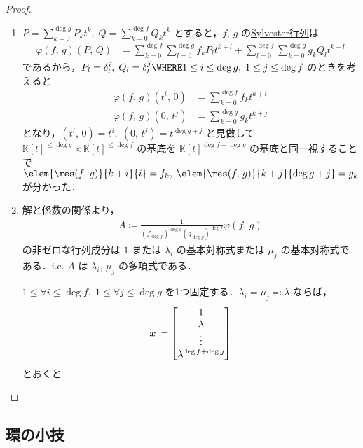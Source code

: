 \documentclass[TQFT_main]{subfiles}
\begin{document}
\begin{proof}
    \begin{enumerate}
        \item $P = \sum_{k=0}^{\deg g} P_k t^k,\; Q = \sum_{k=0}^{\deg f} Q_k t^{k}$ とすると，$f,\, g$ の\hyperref[def:resultant]{Sylvester行列}は
        \begin{align}
            \varphi(f,\, g)(P,\, Q)
            &= \sum_{k = 0}^{\deg f}\sum_{l = 0}^{\deg g} f_k P_{l} t^{k+l} + \sum_{l = 0}^{\deg f}\sum_{k = 0}^{\deg g} g_k Q_{l} t^{k + l}
        \end{align}
        であるから，$P_l = \delta_l^i,\; Q_l = \delta_l^{j} \WHERE 1 \le i \le \deg g,\; 1 \le j \le \deg f$ のときを考えると
        \begin{align}
            \varphi(f,\, g)(t^i,\, 0) 
            &= \sum_{k=0}^{\deg f} f_k t^{k+i} \\
            \varphi(f,\, g)(0,\, t^{j})
            &= \sum_{k=0}^{\deg g} g_k t^{k + j}
        \end{align}
        となり，$(t^i,\, 0) = t^i,\; (0,\, t^j) = t^{\deg g + j}$ と見做して $ \mathbb{K}[t]^{\le \deg g} \times \mathbb{K}[t]^{\le \deg f}$ の基底を $\mathbb{K}[t]^{\deg f + \deg g}$ の基底と同一視することで $\elem{\res (f,\, g)}{k+i}{i} = f_k,\; \elem{\res (f,\, g)}{k + j}{\deg g + j} = g_k$ が分かった．

        \item 解と係数の関係より，
        \begin{align}
            A \coloneqq \frac{1}{(f_{\deg f})^{\deg g} (g_{\deg g})^{\deg f}} \varphi(f,\, g)
        \end{align}
        の非ゼロな行列成分は $1$ または $\lambda_i$ の基本対称式または $\mu_j$ の基本対称式である．i.e. $A$ は $\lambda_i,\, \mu_j$ の多項式である．
        
        $1\le \forall i \le \deg f,\; 1 \le \forall j \le \deg g$ を1つ固定する．$\lambda_i = \mu_j \eqqcolon \lambda$ ならば，
        \begin{align}
            \bm{x} \coloneqq \mqty[1 \\ \lambda \\ \vdots \\ \lambda^{\deg f + \deg g}]
        \end{align}
        とおくと 
    \end{enumerate}
    
\end{proof}


\subsection{環の小技}



    
\end{document}
